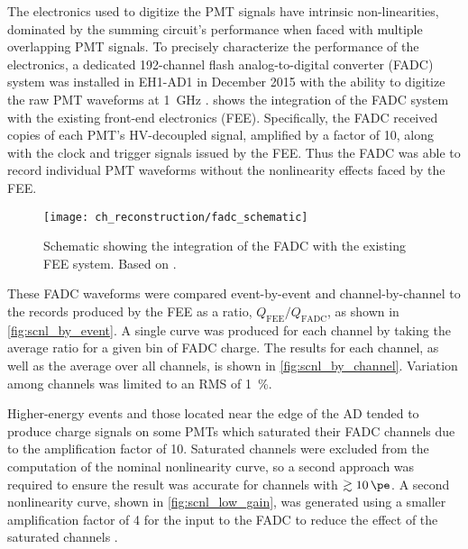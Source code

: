 The electronics used to digitize the PMT signals have intrinsic non-linearities,
dominated by the summing circuit's performance
when faced with multiple overlapping PMT signals.
To precisely characterize the performance of the electronics,
a dedicated 192-channel flash analog-to-digital converter (FADC) system
was installed in EH1-AD1 in December 2015
with the ability to digitize the raw PMT waveforms at \SI{1}{\GHz} \cite{scnl_technote}.
 shows the integration of the FADC system
with the existing front-end electronics (FEE).
Specifically, the FADC received copies of each PMT's HV-decoupled signal,
amplified by a factor of 10,
along with the clock and trigger signals issued by the FEE.
Thus the FADC was able to record individual PMT waveforms
without the nonlinearity effects faced by the FEE.

\begin{figure}
    \centering
    \texttt{[image: ch\_reconstruction/fadc\_schematic]}
    \caption{
        Schematic showing the integration of the FADC
        with the existing FEE system.
        Based on \cite{scnl_poster}.
    }
    \label{fig:fadc_schematic}
\end{figure}

These FADC waveforms were compared event-by-event and channel-by-channel
to the records produced by the FEE as a ratio, $Q_\text{FEE}/Q_\text{FADC}$,
as shown in \cref{fig:scnl_by_event}.
A single curve was produced for each channel by taking the average ratio
for a given bin of FADC charge.
The results for each channel, as well as the average over all channels,
is shown in \cref{fig:scnl_by_channel}.
Variation among channels was limited to an RMS of \SI{1}{\percent}.

Higher-energy events and those located near the edge of the AD
tended to produce charge signals on some PMTs which
saturated their FADC channels due to the amplification factor of 10.
Saturated channels were excluded from the computation of the nominal nonlinearity curve,
so a second approach was required to ensure the result was accurate
for channels with $\gtrsim \SI{10}{\pe}$.
A second nonlinearity curve, shown in \cref{fig:scnl_low_gain},
was generated using a smaller amplification factor of 4 for the input to the FADC
to reduce the effect of the saturated channels \cite{scnl_slides}.

